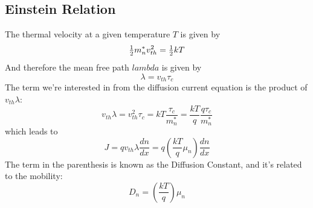 \subsection{Einstein Relation}
The thermal velocity at a given temperature $T$ is given by
\begin{equation}
        {\textstyle{1 \over 2}}m_n^*v_{th}^2 = {\textstyle{1 \over 2}}kT
\end{equation}
And therefore the mean free path $lambda$ is given by
\begin{equation}
        \lambda  = {v_{th}}{\tau _c}
\end{equation}
The term we're interested in from the diffusion current equation is the product of $v_{th} \lambda$:
\begin{equation}
        {v_{th}}\lambda  = v_{th}^2{\tau _c} = kT\frac{{{\tau _c}}}{{m_n^*}} = \frac{{kT}}{q}\frac{{q{\tau _c}}}{{m_n^*}}
\end{equation}
which leads to
\begin{equation}
        J = q{v_{th}}\lambda \frac{{dn}}{{dx}} = q\left( {\frac{{kT}}{q}{\mu _n}} \right)\frac{{dn}}{{dx}}
\end{equation}
The term in the parenthesis is known as the Diffusion Constant, and it's related to the mobility: 
\begin{equation}
        {D_n} = \left( {\frac{{kT}}{q}} \right){\mu _n}
\end{equation}
